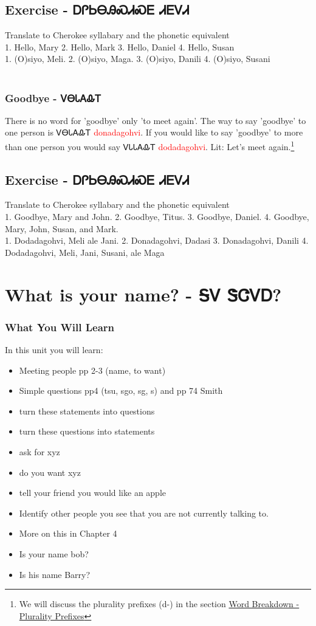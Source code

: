 \section{Exercise - ᎠᎵᏏᎾᎯᏍᏗᏍᎬ ᏗᎬᏙᏗ}
Translate to Cherokee syllabary and the phonetic equivalent\\
1. Hello, Mary 2. Hello, Mark 3. Hello, Daniel 4. Hello, Susan\\
1. (O)siyo, Meli. 2. (O)siyo, Maga. 3. (O)siyo, Danili 4. (O)siyo, Susani\\
\
\subsection{Goodbye - ᏙᎾᏓᎪᎲᎢ}
There is no word for 'goodbye' only 'to meet again'. The way to say 'goodbye' to one person is ᏙᎾᏓᎪᎲᎢ \textcolor{red}{donadagohvi}. If you would like to say 'goodbye' to more than one person you would say ᏙᏓᏓᎪᎲᎢ \textcolor{red}{dodadagohvi}.  Lit: Let's meet again.\footnote{We will discuss the plurality prefixes (d-) in the section \hyperref[sec:wordBreakdownPluralityPrefixes]{Word Breakdown - Plurality Prefixes}}
\section{Exercise - ᎠᎵᏏᎾᎯᏍᏗᏍᎬ ᏗᎬᏙᏗ}
Translate to Cherokee syllabary and the phonetic equivalent\\
1. Goodbye, Mary and John. 2. Goodbye, Titus. 3. Goodbye, Daniel. 4. Goodbye, Mary, John, Susan, and Mark.\\
1. Dodadagohvi, Meli ale Jani. 2. Donadagohvi, Dadasi 3. Donadagohvi, Danili 4. Dodadagohvi, Meli, Jani, Susani, ale Maga\\
\index{What is your name?}
\chapter*{What is your name? - ᎦᏙ ᏕᏣᏙᎠ?}
\subsection{What You Will Learn}
In this unit you will learn:
\begin{itemize}
\item Meeting people pp 2-3 (name, to want)
\item Simple questions pp4 (tsu, sgo, sg, s) and pp 74 Smith
\item turn these statements into questions
\item turn these questions into statements
\item ask for xyz
\item do you want xyz
\item tell your friend you would like an apple
\item Identify other people you see that you are not currently talking to.
\item More on this in Chapter 4
\item Is your name bob?
\item Is his name Barry?
\end{itemize}\newpage

